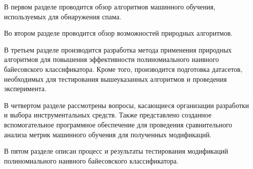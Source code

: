 В первом разделе проводится обзор алгоритмов машинного обучения, используемых для обнаружения спама.

Во втором разделе проводится обзор возможностей природных алгоритмов.

В третьем разделе производится разработка метода применения природных алгоритмов для повышения эффективности
полиномиального наивного байесовского классификатора. Кроме того, производится подготовка датасетов, необходимых для тестирования вышеуказанных алгоритмов и проведения эксперимента.

В четвертом разделе рассмотрены вопросы, касающиеся организации разработки и выбора инструментальных средств.
Также представлено созданное вспомогательное программное обеспечение для проведения сравнительного анализа
метрик машинного обучения для полученных модификаций.

В пятом разделе описан процесс и результаты тестирования модификаций полиномиального наивного байесовского
классификатора.

